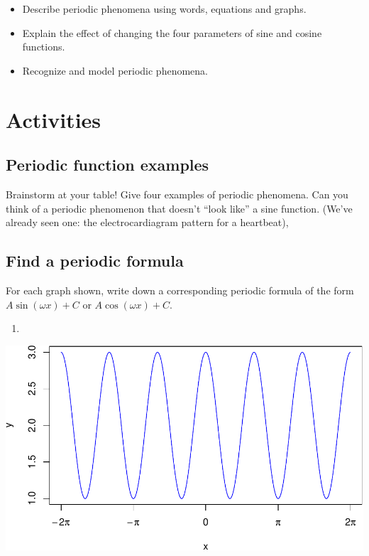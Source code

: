 \documentclass[
]{book}
\providecommand{\tightlist}{%
  \setlength{\itemsep}{0pt}\setlength{\parskip}{0pt}}
\begin{document}
\begin{itemize}
\tightlist
\item
  Describe periodic phenomena using words, equations and graphs.
\item
  Explain the effect of changing the four parameters of sine and cosine functions.
\item
  Recognize and model periodic phenomena.
\end{itemize}

\hypertarget{activities-5}{%
\section{Activities}\label{activities-5}}

\hypertarget{periodic-function-examples}{%
\subsection{Periodic function examples}\label{periodic-function-examples}}

Brainstorm at your table! Give four examples of periodic phenomena. Can you think of a periodic phenomenon that doesn't ``look like'' a sine function. (We've already seen one: the electrocardiagram pattern for a heartbeat),

\hypertarget{find-a-periodic-formula}{%
\subsection{Find a periodic formula}\label{find-a-periodic-formula}}

For each graph shown, write down a corresponding periodic formula of the form \(A \sin(\omega x) + C\) or \(A \cos(\omega x) + C\).

\begin{enumerate}
\def\labelenumi{\arabic{enumi}.}
\item
\end{enumerate}

\includegraphics[width=0.75\linewidth]{_bookdown_files/math135_handbook_files/figure-latex/periodic4-1}
\end{document}
